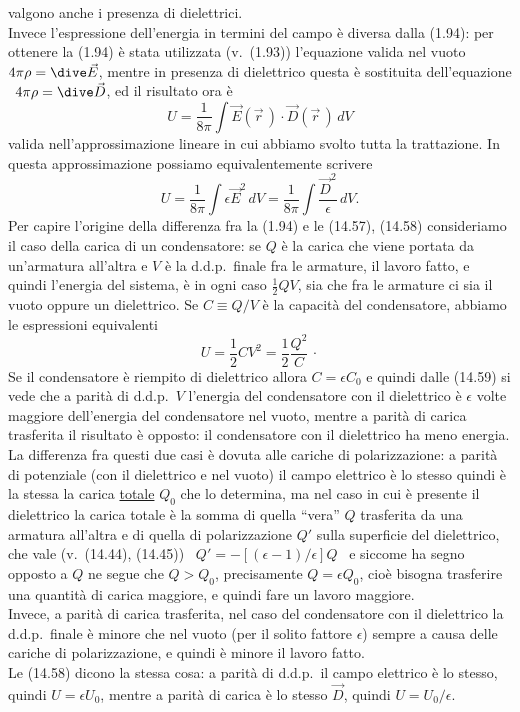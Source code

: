 valgono anche i presenza di dielettrici.\\
Invece l'espressione dell'energia in termini del campo \`e diversa dalla (1.94):
per ottenere la (1.94) \`e stata utilizzata \big(v.\ (1.93)\big) l'equazione
valida nel vuoto \ $4\pi\rho=\dive\vec E$, mentre in presenza di dielettrico
questa \`e sostituita dell'equazione \ $4\pi\rho=\dive\vec D$, ed il risultato
ora \`e
\begin{equation}
  U=\frac{1}{8\pi}\int\vec E(\vec r\,)\cdot\vec D(\vec r\,)\,dV
  \tag{14.57}
\end{equation}
valida nell'approssimazione lineare in cui abbiamo svolto tutta la trattazione.
In questa approssimazione possiamo equivalentemente scrivere
\begin{equation}
  U=\frac{1}{8\pi}\int\epsilon\vec E^2\,dV
  =\frac{1}{8\pi}\int\frac{\vec D^2}{\epsilon}\,dV.
  \tag{14.58}
\end{equation}
Per capire l'origine della differenza fra la (1.94) e le (14.57), (14.58)
consideriamo il caso della carica di un condensatore: se $Q$ \`e la carica che
viene portata da un'armatura all'altra e $V$ \`e la d.d.p.\ finale fra le
armature, il lavoro fatto, e quindi l'energia del sistema, \`e in ogni caso
$\frac{1}{2}QV$, sia che fra le armature ci sia il vuoto oppure un dielettrico.
Se $C\equiv Q/V$ \`e la capacit\`a del condensatore, abbiamo le espressioni
equivalenti
\begin{equation}
  U=\frac{1}{2}CV^2=\frac{1}{2}\frac{Q^2}{C}\,\cdot
  \tag{14.59}
\end{equation}
Se il condensatore \`e riempito di dielettrico allora $C=\epsilon C_0$ e quindi
dalle (14.59) si vede che a parit\`a di d.d.p.\ $V$ l'energia del condensatore
con il dielettrico \`e $\epsilon$ volte maggiore dell'energia del condensatore
nel vuoto, mentre a parit\`a di carica trasferita il risultato \`e opposto: il
condensatore con il dielettrico ha meno energia.\\
La differenza fra questi due casi \`e dovuta alle cariche di polarizzazione: a
parit\`a di potenziale (con il dielettrico e nel vuoto) il campo elettrico \`e
lo stesso quindi \`e la stessa la carica \underline{totale} $Q_0$ che lo
determina, ma nel caso in cui \`e presente il dielettrico la carica totale \`e
la somma di quella ``vera'' $Q$ trasferita da una armatura all'altra e di quella
di polarizzazione $Q'$ sulla superficie del dielettrico, che vale
\big(v.\ (14.44), (14.45)\big) \ $Q'=-[(\epsilon-1)/\epsilon]Q$ \ e siccome ha
segno opposto a $Q$ ne segue che $Q>Q_0$, precisamente $Q=\epsilon Q_0$, cio\`e
bisogna trasferire una quantit\`a di carica maggiore, e quindi fare un lavoro
maggiore.\\
Invece, a parit\`a di carica trasferita, nel caso del condensatore con il
dielettrico la d.d.p.\ finale \`e minore che nel vuoto (per il solito fattore
$\epsilon$) sempre a causa delle cariche di polarizzazione, e quindi \`e minore
il lavoro fatto.\\
Le (14.58) dicono la stessa cosa: a parit\`a di d.d.p.\ il campo elettrico \`e
lo stesso, quindi $U=\epsilon U_0$, mentre a parit\`a di carica \`e lo stesso
$\vec D$, quindi $U=U_0/\epsilon$.

